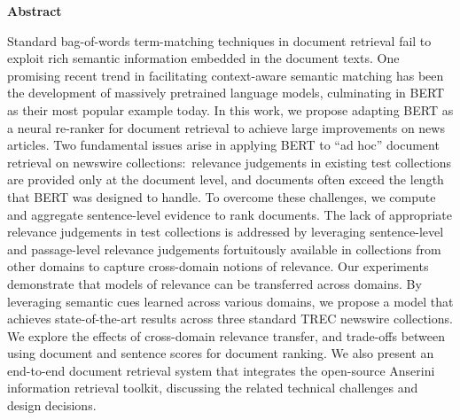 \cleardoublepage

%
%  

\cleardoublepage


\begin{center}\textbf{Abstract}\end{center}
Standard bag-of-words term-matching techniques in document retrieval fail to exploit rich semantic information embedded in the document texts.
One promising recent trend in facilitating context-aware semantic matching has been the development of massively pretrained language models, culminating in BERT as their most popular example today.
In this work, we propose adapting BERT as a neural re-ranker for document retrieval to achieve large improvements on news articles.
Two fundamental issues arise in applying BERT to ``ad hoc'' document retrieval on newswire collections:\
relevance judgements in existing test collections are provided only at the document level, and documents often exceed the length that BERT was designed to handle.
To overcome these challenges, we compute and aggregate sentence-level evidence to rank documents.
The lack of appropriate relevance judgements in test collections is addressed by leveraging sentence-level and passage-level relevance judgements fortuitously available in collections from other domains to capture cross-domain notions of relevance.
Our experiments demonstrate that models of relevance can be transferred across domains.
By leveraging semantic cues learned across various domains, we propose a model that achieves state-of-the-art results across three standard TREC newswire collections.
We explore the effects of cross-domain relevance transfer, and trade-offs between using document and sentence scores for document ranking.
We also present an end-to-end document retrieval system that integrates the open-source Anserini information retrieval toolkit, discussing the related technical challenges and design decisions.

\cleardoublepage

